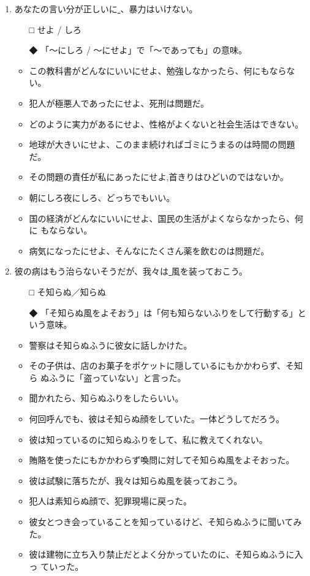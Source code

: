 \documentclass[
uplatex,
b5paper,
10pt,
dvipdfmx
]{jsbook}
\begin{document}
\begin{enumerate}
\item あなたの言い分が正しいに\underline{   }、暴力はいけない。
\begin{itemize}
\item[□] せよ / しろ
\item[◆] 「〜にしろ / 〜にせよ」で「〜であっても」の意味。
\end{itemize}
\begin{itemize}
\item この教科書がどんなにいいにせよ、勉強しなかったら、何にもならない。
\item 犯人が極悪人であったにせよ、死刑は問題だ。
\item どのように実力があるにせよ、性格がよくないと社会生活はできない。
\item 地球が大きいにせよ、このまま続ければゴミにうまるのは時間の問題だ。
\item その問題の責任が私にあったにせよ,首きりはひどいのではないか。
\item 朝にしろ夜にしろ、どっちでもいい。
\item 国の経済がどんなにいいにせよ、国民の生活がよくならなかったら、何に
      もならない。
\item 病気になったにせよ、そんなにたくさん薬を飲むのは問題だ。
\end{itemize}

 \item 彼の病はもう治らないそうだが、我々は\underline{   }風を装っておこう。 
\begin{itemize}
\item[□] そ知らぬ／知らぬ
\item[◆] 「そ知らぬ風をよそおう」は「何も知らないふりをして行動する」と
	  いう意味。
\end{itemize}
\begin{itemize}
\item 警察はそ知らぬふうに彼女に話しかけた。
\item その子供は、店のお菓子をポケットに隠しているにもかかわらず、そ知ら
      ぬふうに「盗っていない」と言った。
\item 聞かれたら、知らぬふりをしたらいい。
\item 何回呼んでも、彼はそ知らぬ顔をしていた。一体どうしてだろう。
\item 彼は知っているのに知らぬふりをして、私に教えてくれない。
\item 賄賂を使ったにもかかわらず喚問に対してそ知らぬ風をよそおった。
\item 彼は試験に落ちたが、我々は知らぬ風を装っておこう。
\item 犯人は素知らぬ顔で、犯罪現場に戻った。
\item 彼女とつき会っていることを知っているけど、そ知らぬふうに聞いてみた。
\item 彼は建物に立ち入り禁止だとよく分かっていたのに、そ知らぬふうに入っ
      ていった。
\end{itemize}


\end{enumerate}
\end{document}
